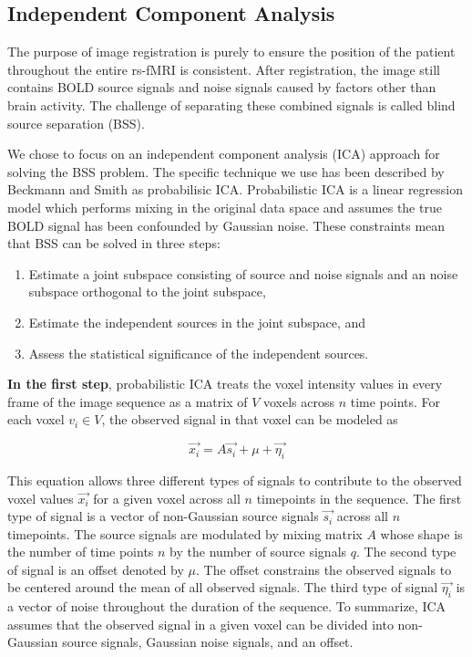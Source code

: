\subsection{Independent Component Analysis}

The purpose of image registration is purely to ensure the position of the patient throughout the entire rs-fMRI is consistent. After registration, the image still contains BOLD source signals and noise signals caused by factors other than brain activity. The challenge of separating these combined signals is called blind source separation (BSS). 

We chose to focus on an independent component analysis (ICA) approach for solving the BSS problem. The specific technique we use has been described by Beckmann and Smith as probabilisic ICA. Probabilistic ICA is a linear regression model which performs mixing in the original data space and assumes the true BOLD signal has been confounded by Gaussian noise. These constraints mean that BSS can be solved in three steps:

\begin{enumerate}
\item Estimate a joint subspace consisting of source and noise signals and an noise subspace orthogonal to the joint subspace,
\item Estimate the independent sources in the joint subspace, and 
\item Assess the statistical significance of the independent sources.
\end{enumerate} 

\textbf{In the first step}, probabilistic ICA treats the voxel intensity values in every frame of the image sequence as a matrix of $V$ voxels across $n$ time points. For each voxel $v_i \in V$, the observed signal in that voxel can be modeled as

\begin{equation}
\label{ch4:eq:ica01}
\vec{x_i} = A \vec{s_i} + \mu + \vec{\eta_i}
\end{equation}

\noindent This equation allows three different types of signals to contribute to the observed voxel values $\vec{x_i}$ for a given voxel across all $n$ timepoints in the sequence. The first type of signal is a vector of non-Gaussian source signals $\vec{s_i}$ across all $n$ timepoints. The source signals are modulated by mixing matrix $A$ whose shape is the number of time points $n$ by the number of source signals $q$. The second type of signal is an offset denoted by $\mu$. The offset constrains the observed signals to be centered around the mean of all observed signals. The third type of signal $\vec{\eta_i}$ is a vector of noise throughout the duration of the sequence. To summarize, ICA assumes that the observed signal in a given voxel can be divided into non-Gaussian source signals, Gaussian noise signals, and an offset.

